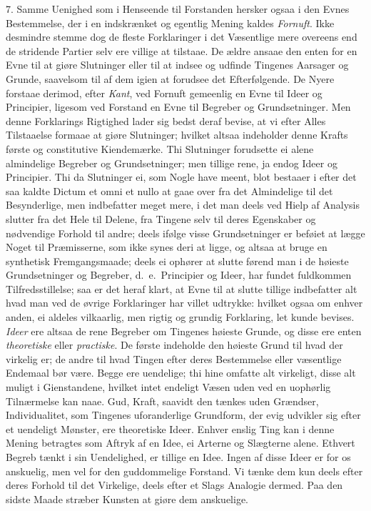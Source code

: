 \documentclass[12pt,a4paper]{article}
\newcommand{\opage}[1]{\marginnote{\footnotesize\textit{[#1]}}}
\begin{document}
7. Samme Uenighed som i Henseende til Forstanden hersker ogsaa i den Evnes Bestemmelse,
der i en indskrænket og egentlig Mening kaldes \emph{Fornuft}. Ikke desmindre stemme dog
de fleste Forklaringer i det Væsentlige mere overeens end de stridende Partier selv ere
villige
\opage{167} at tilstaae. De ældre ansaae den enten for en Evne til at giøre Slutninger eller til at
indsee og udfinde Tingenes Aarsager og Grunde, saavelsom til af dem igien at forudsee det
Efterfølgende. De Nyere forstaae derimod, efter \emph{Kant}, ved Fornuft gemeenlig en Evne
til Ideer og Principier, ligesom ved Forstand en Evne til Begreber og Grundsetninger. Men
denne Forklarings Rigtighed lader sig bedst deraf bevise, at vi efter Alles Tilstaaelse
formaae at giøre Slutninger; hvilket altsaa indeholder denne Krafts første og constitutive
Kiendemærke. Thi Slutninger forudsette ei alene almindelige Begreber og Grundsetninger;
men tillige rene, ja endog Ideer og Principier. Thi da Slutninger ei, som Nogle have
meent, blot bestaaer i efter det saa kaldte Dictum et omni et nullo at gaae over fra det
Almindelige til det Besynderlige, men indbefatter meget mere, i det man deels ved Hielp af
Analysis slutter fra det Hele til Delene, fra Tingene selv til deres Egenskaber og
nødvendige Forhold til andre; deels ifølge visse Grundsetninger er beføiet at lægge Noget
til Præmisserne, som ikke synes deri at ligge, og altsaa at bruge en synthetisk
Fremgangsmaade; deels ei ophører at slutte førend man i de høieste Grundsetninger og
Begreber, d.~e.\ Principier og Ideer, har fundet fuldkommen Tilfredsstillelse; saa er det
heraf klart, at Evne til at slutte tillige indbefatter alt hvad man ved de øvrige
Forklaringer har villet udtrykke: hvilket ogsaa om enhver anden, ei aldeles vilkaarlig,
men
\opage{168} rigtig og grundig Forklaring, let kunde bevises. \emph{Ideer} ere altsaa de rene Begreber
om Tingenes høieste Grunde, og disse ere enten \emph{theoretiske} eller \emph{practiske}.
De første indeholde den høieste Grund til hvad der virkelig er; de andre til hvad Tingen
efter deres Bestemmelse eller væsentlige Endemaal bør være. Begge ere uendelige; thi hine
omfatte alt virkeligt, disse alt muligt i Gienstandene, hvilket intet endeligt Væsen uden
ved en uophørlig Tilnærmelse kan naae. Gud, Kraft, saavidt den tænkes uden Grændser,
Individualitet, som Tingenes uforanderlige Grundform, der evig udvikler sig efter et
uendeligt Mønster, ere theoretiske Ideer. Enhver enslig Ting kan i denne Mening betragtes
som Aftryk af en Idee, ei Arterne og Slægterne alene. Ethvert Begreb tænkt i sin
Uendelighed, er tillige en Idee. Ingen af disse Ideer er for os anskuelig, men vel for den
guddommelige Forstand. Vi tænke dem kun deels efter deres Forhold til det Virkelige, deels
efter et Slags Analogie dermed. Paa den sidste Maade stræber Kunsten at giøre dem
anskuelige.
\end{document}
